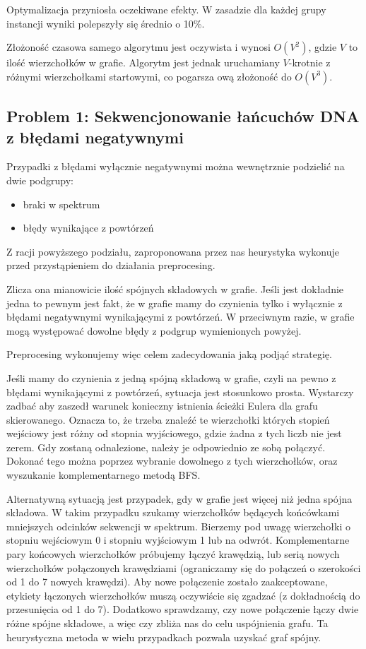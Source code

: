 \documentclass[a4paper]{article}
\begin{document}
Optymalizacja przyniosła oczekiwane efekty. W zasadzie dla każdej grupy instancji wyniki polepszyły się średnio o 10\%.

Złożoność czasowa samego algorytmu jest oczywista i wynosi $O(V^2)$, gdzie $V$ to ilość wierzchołków w grafie. Algorytm jest
jednak uruchamiany $V$-krotnie z różnymi wierzchołkami startowymi, co pogarsza ową złożoność do $O(V^3)$.


\subsection{Problem 1: Sekwencjonowanie łańcuchów DNA z błędami negatywnymi}
Przypadki z błędami wyłącznie negatywnymi można wewnętrznie podzielić na dwie podgrupy:
\begin{itemize}
\item braki w spektrum
\item błędy wynikające z powtórzeń
\end{itemize}
Z racji powyższego podziału, zaproponowana przez nas heurystyka wykonuje przed przystąpieniem do działania preprocesing.

Zlicza ona mianowicie ilość spójnych składowych w grafie. Jeśli jest dokładnie jedna to pewnym jest fakt, że w grafie
mamy do czynienia tylko i wyłącznie z błędami negatywnymi wynikającymi z powtórzeń. W przeciwnym razie, w grafie
mogą występować dowolne błędy z podgrup wymienionych powyżej.

Preprocesing wykonujemy więc celem zadecydowania jaką podjąć strategię.

Jeśli mamy do czynienia z jedną spójną składową w grafie, czyli na pewno z błędami wynikającymi z powtórzeń, sytuacja jest
stosunkowo prosta. Wystarczy zadbać aby zaszedł warunek konieczny istnienia ścieżki Eulera dla grafu skierowanego. 
Oznacza to, że trzeba znaleźć te wierzchołki których stopień wejściowy jest różny od stopnia wyjściowego, gdzie żadna
z tych liczb nie jest zerem. Gdy zostaną odnalezione, należy je odpowiednio ze sobą połączyć. Dokonać tego można poprzez
wybranie dowolnego z tych wierzchołków, oraz wyszukanie komplementarnego metodą BFS.

Alternatywną sytuacją jest przypadek, gdy w grafie jest więcej niż jedna spójna składowa. W takim przypadku
szukamy wierzchołków będących końcówkami mniejszych odcinków sekwencji w spektrum. Bierzemy pod uwagę wierzchołki o
stopniu wejściowym 0 i stopniu  wyjściowym 1 lub na odwrót. Komplementarne pary końcowych wierzchołków próbujemy
łączyć krawędzią, lub serią nowych wierzchołków połączonych krawędziami (ograniczamy się do połączeń o szerokości od 1
do 7 nowych krawędzi). Aby nowe połączenie zostało zaakceptowane, etykiety łączonych wierzchołków muszą oczywiście się
zgadzać (z dokładnością do przesunięcia od 1 do 7). Dodatkowo sprawdzamy, czy nowe połączenie łączy dwie różne
spójne składowe, a więc czy zbliża nas do celu uspójnienia grafu.
Ta heurystyczna metoda w wielu przypadkach pozwala uzyskać graf spójny.
\end{document}
